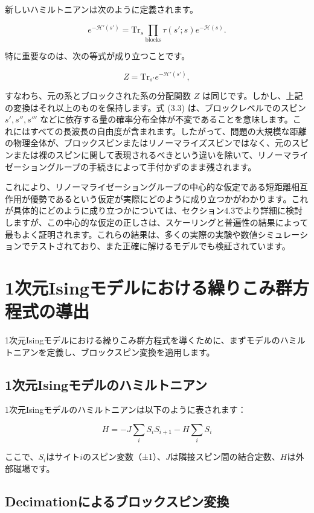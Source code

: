 \documentclass[a4paper,10pt]{ltjsarticle} %
\begin{document}
新しいハミルトニアンは次のように定義されます。

\[ e^{-\mathcal{H}'(s')} = \text{Tr}_s \prod_{\text{blocks}} \tau(s'; s) e^{-\mathcal{H}(s)}. \tag{3.3} \]

特に重要なのは、次の等式が成り立つことです。

\[ Z = \text{Tr}_{s'} e^{-\mathcal{H}'(s')}, \tag{3.4} \]

すなわち、元の系とブロックされた系の分配関数 \( Z \) は同じです。しかし、上記の変換はそれ以上のものを保持します。式 (3.3) は、ブロックレベルでのスピン \( s', s'', s''' \) などに依存する量の確率分布全体が不変であることを意味します。これにはすべての長波長の自由度が含まれます。したがって、問題の大規模な距離の物理全体が、ブロックスピンまたはリノーマライズスピンではなく、元のスピンまたは裸のスピンに関して表現されるべきという違いを除いて、リノーマライゼーショングループの手続きによって手付かずのまま残されます。

これにより、リノーマライゼーショングループの中心的な仮定である短距離相互作用が優勢であるという仮定が実際にどのように成り立つかがわかります。これが具体的にどのように成り立つかについては、セクション4.3でより詳細に検討しますが、この中心的な仮定の正しさは、スケーリングと普遍性の結果によって最もよく証明されます。これらの結果は、多くの実際の実験や数値シミュレーションでテストされており、また正確に解けるモデルでも検証されています。


\section*{1次元Isingモデルにおける繰りこみ群方程式の導出}

1次元Isingモデルにおける繰りこみ群方程式を導くために、まずモデルのハミルトニアンを定義し、ブロックスピン変換を適用します。

\subsection*{1次元Isingモデルのハミルトニアン}

1次元Isingモデルのハミルトニアンは以下のように表されます：

\[
H = -J \sum_{i} S_i S_{i+1} - H \sum_i S_i
\]

ここで、\( S_i \)はサイト\( i \)のスピン変数（±1）、\( J \)は隣接スピン間の結合定数、\( H \)は外部磁場です。

\subsection*{Decimationによるブロックスピン変換}
\end{document}
